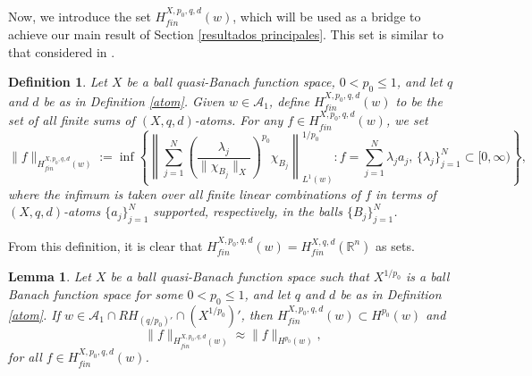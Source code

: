 \documentclass[oneside,10pt]{article}
\newtheorem{definition}[theorem]{Definition}
\newtheorem{lemma}[theorem]{Lemma}
\begin{document}
Now, we introduce the set $H^{X, p_0, q, d}_{fin}(w)$, which will be used as a bridge to achieve our main result of Section \ref{resultados principales}. This set is similar to that considered in \cite[Section 7.3]{UrWang}.

\begin{definition}
Let $X$ be a ball quasi-Banach function space, $0 < p_0 \leq 1$, and let $q$ and $d$ be as in Definition \ref{atom}. Given 
$w \in \mathcal{A}_1$, define $H^{X, p_0, q, d}_{fin}(w)$ to be the set of all finite sums of $(X, q, d)$-atoms. For any 
$f \in H^{X, p_0, q, d}_{fin}(w)$, we set
\[
\| f \|_{H^{X, p_0, q, d}_{fin}(w)} := \inf \left\{ \left\| \sum_{j=1}^{N} \left( \frac{\lambda_j}{\| \chi_{B_j} \|_X} 
\right)^{p_0} \chi_{B_j} \right\|_{L^1(w)}^{1/p_0} : f = \sum_{j=1}^{N} \lambda_j a_{j}, \, \{ \lambda_j \}_{j=1}^{N} \subset [0, \infty) \right\},
\]
where the infimum is taken over all finite linear combinations of $f$ in terms of $(X, q, d)$-atoms $\{ a_j \}_{j=1}^{N}$ supported, respectively, in the balls $\{ B_j \}_{j=1}^{N}$.
\end{definition}

From this definition, it is clear that $H^{X, p_0, q, d}_{fin}(w) = H^{X, q, d}_{fin}(\mathbb{R}^n)$ as sets.

\begin{lemma} \label{HX finito 2}
Let $X$ be a ball quasi-Banach function space such that $X^{1/p_0}$ is a ball Banach function space for some $0 < p_0 \leq 1$, and 
let $q$ and $d$ be as in Definition \ref{atom}. If $w \in \mathcal{A}_1 \cap RH_{(q/p_0)'} \cap (X^{1/p_0})'$, then 
$H^{X, p_0, q, d}_{fin}(w) \subset H^{p_0}(w)$ and
\[
\| f \|_{H^{X, p_0, q, d}_{fin}(w)} \approx \| f \|_{H^{p_0}(w)},
\]
for all $f \in H^{X, p_0, q, d}_{fin}(w)$.
\end{lemma}
\end{document}
